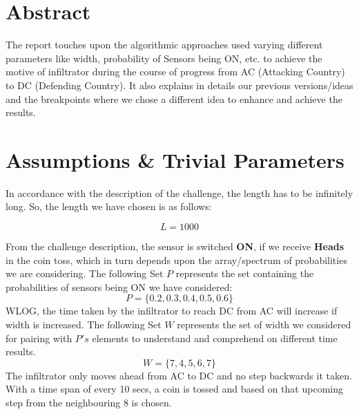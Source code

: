 \documentclass[12pt]{article}
\begin{document}
\maketitle


\section{Abstract}
The report touches upon the algorithmic approaches used varying different parameters like width, probability of Sensors being ON, etc. to achieve the motive of infiltrator during the course of progress from AC (Attacking Country) to DC (Defending Country).
It also explains in details our previous versions/ideas and the breakpoints where we chose a different idea to enhance and achieve the results.


\section{Assumptions \& Trivial Parameters}
In accordance with the description of the challenge, the length has to be infinitely long. So, the length we have chosen is as follows:

\begin{equation*}
    L = 1000
\end{equation*}

From the challenge description, the sensor is switched \textbf{ON}, if we receive \textbf{Heads} in the coin toss, which in turn depends upon the array/spectrum of probabilities we are considering.
The following Set $P$ represents the set containing the probabilities of sensors being ON we have considered:
\begin{equation*}
    P = \{0.2, 0.3, 0.4, 0.5, 0.6\}
\end{equation*}
WLOG, the time taken by the infiltrator to reach DC from AC will increase if width is increased. The following Set $W$ represents the set of width we considered for pairing with $P's$ elements to understand and comprehend on different time results.
\begin{equation*}
    W = \{7, 4, 5, 6, 7\}
\end{equation*}
The infiltrator only moves ahead from AC to DC and no step backwards it taken. With a time span of every 10 secs, a coin is tossed and based on that upcoming step from the neighbouring 8 is chosen.
\end{document}
